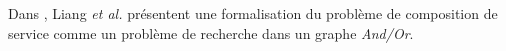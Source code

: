   \begin{text}
    Dans \cite{liang2005and}, Liang \textit{et al.} présentent une
    formalisation du problème de composition de service comme un
    problème de recherche dans un graphe \textit{And/Or}.



  \end{text}

